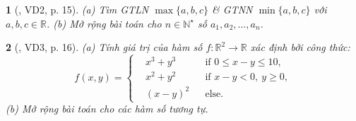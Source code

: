 \documentclass{article}
\newtheorem{baitoan}{}
\begin{document}
\begin{baitoan}[\cite{Doanh_Tuan_Pascal}, VD2, p. 15]
	(a) Tìm {\rm GTLN} $\max\{a,b,c\}$ \& {\rm GTNN} $\min\{a,b,c\}$ với $a,b,c\in\mathbb{R}$. (b) Mở rộng bài toán cho $n\in\mathbb{N}^\star$ số $a_1,a_2,\ldots,a_n$.
\end{baitoan}

\begin{baitoan}[\cite{Doanh_Tuan_Pascal}, VD3, p. 16]
	(a) Tính giá trị của hàm số $f:\mathbb{R}^2\to\mathbb{R}$ xác định bởi công thức:
	\begin{equation*}
		f(x,y) = \left\{\begin{split}
			&x^3 + y^3&&\mbox{if }0\le x - y\le10,\\
			&x^2 + y^2&&\mbox{if } x - y < 0,\ y\ge0,\\
			&(x - y)^2&&\mbox{else}.
		\end{split}\right.
	\end{equation*}
	(b) Mở rộng bài toán cho các hàm số tương tự.
\end{baitoan}
\end{document}
